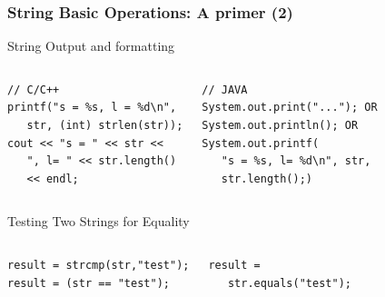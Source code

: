 \documentclass{beamer}
\begin{document}
\begin{frame}
  \frametitle{String Basic Operations: A primer (2)}
  {\smaller
    \begin{block}{String Output and formatting}
      \begin{columns}[T]
\begin{verbatim}
// C/C++
printf("s = %s, l = %d\n",
   str, (int) strlen(str));
cout << "s = " << str << 
   ", l= " << str.length() 
   << endl;
\end{verbatim}
\begin{verbatim}
// JAVA
System.out.print("..."); OR
System.out.println(); OR
System.out.printf(
   "s = %s, l= %d\n", str, 
   str.length();)
\end{verbatim}
      \end{columns}
    \end{block}
    \begin{block}{Testing Two Strings for Equality}
      \begin{columns}[T]
\begin{verbatim}
result = strcmp(str,"test");
result = (str == "test");
\end{verbatim}
\begin{verbatim}
result = 
   str.equals("test");

\end{verbatim}
      \end{columns}
    \end{block}
  }
\end{frame}
\end{document}
